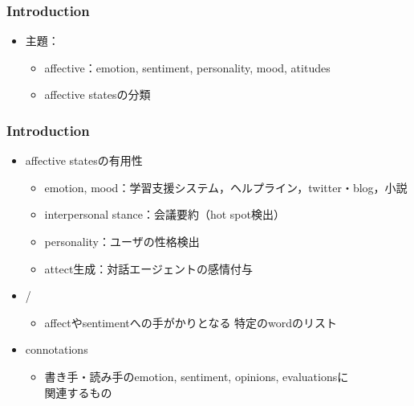 
\begin{frame}
    \frametitle{Introduction}
    \begin{itemize}
        \item 主題：
        \begin{itemize}
            \item affective：emotion, sentiment, personality, mood, atitudes
            \item affective statesの分類 
        \end{itemize}
    \end{itemize}
\end{frame}


\begin{frame}
    \frametitle{Introduction}
    \begin{itemize}
        \item affective statesの有用性
        \begin{itemize}
            \item emotion, mood：学習支援システム，ヘルプライン，twitter・blog，小説
            \item interpersonal stance：会議要約（hot spot検出）
            \item personality：ユーザの性格検出
            \item attect生成：対話エージェントの感情付与
        \end{itemize}
    \end{itemize}
    \begin{itemize}
        \item {} / 
        \begin{itemize}
            \item affectやsentimentへの手がかりとなる 特定のwordのリスト
        \end{itemize}
        \item connotations
        \begin{itemize}
            \item 書き手・読み手のemotion, sentiment, opinions, evaluationsに\\
                関連するもの
        \end{itemize}
    \end{itemize}
\end{frame}
